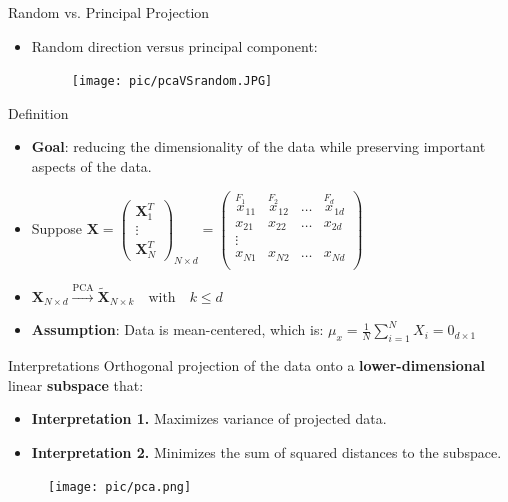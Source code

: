 \documentclass[serif, aspectratio=169]{beamer}
\begin{document}
\begin{frame}{Random vs. Principal Projection}
    \begin{itemize}
        \item Random direction versus principal component:
        \begin{figure}[htpb]
            \begin{center}
                \texttt{[image: pic/pcaVSrandom.JPG]}
            \end{center}
        \end{figure}
    \end{itemize}
\end{frame}


\begin{frame}{Definition}
    \begin{itemize}
        \item \textbf{Goal}: reducing the dimensionality of the data while preserving important aspects of the data.
        \item Suppose $\mathbf{X} = \begin{pmatrix} \mathbf{X}_1^T \\ \vdots \\ \mathbf{X}_N^T \end{pmatrix}_{N \times d} = \begin{pmatrix}  
\overset{\displaystyle F_1}x_{11} & \overset{\displaystyle F_2}x_{12} & \hdots & \overset{\displaystyle F_d}x_{1d} \\
x_{21} & x_{22} & \hdots & x_{2d} \\
\vdots \\
x_{N1} & x_{N2} & \hdots & x_{Nd} \\
\end{pmatrix} $
        \item $\mathbf{X}_{N \times d} \xrightarrow{\text{PCA}} \tilde{\mathbf{X}}_{N \times k} \quad \text{with} \quad k \leq d$
        \item \textbf{Assumption}: Data is mean-centered, which is: $\mu_x = \frac{1}{N} \sum_{i=1}^{N}X_i = 0_{d \times 1}$
    \end{itemize}
\end{frame}

\begin{frame}{Interpretations}
    Orthogonal projection of the data onto a \textbf{lower-dimensional} linear \textbf{subspace} that:
    \begin{itemize}
        \item \textbf{Interpretation 1.} Maximizes variance of projected data.
        \item \textbf{Interpretation 2.} Minimizes the sum of squared distances to the subspace.
    \end{itemize}
    \begin{figure}[htpb]
        \begin{center}
            \texttt{[image: pic/pca.png]}
        \end{center}
    \end{figure}
\end{frame}
\end{document}
